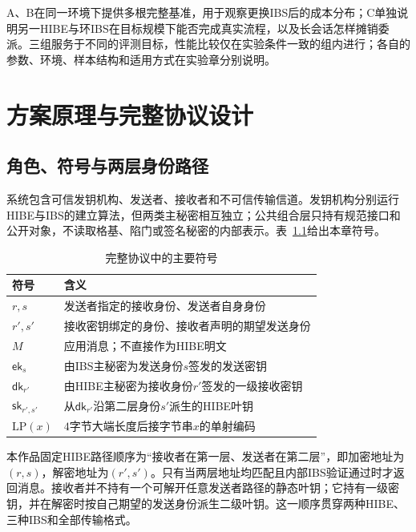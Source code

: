 \documentclass[UTF8,a4paper,12pt,oneside,openany,fontset=fandol]{ctexrep}
\begin{document}
A、B在同一环境下提供多根完整基准，用于观察更换IBS后的成本分布；C单独说明另一HIBE与环IBS在目标规模下能否完成真实流程，以及长会话怎样摊销委派。三组服务于不同的评测目标，性能比较仅在实验条件一致的组内进行；各自的参数、环境、样本结构和适用方式在实验章分别说明。

\chapter{方案原理与完整协议设计}

\section{角色、符号与两层身份路径}
系统包含可信发钥机构、发送者、接收者和不可信传输信道。发钥机构分别运行HIBE与IBS的建立算法，但两类主秘密相互独立；公共组合层只持有规范接口和公开对象，不读取格基、陷门或签名秘密的内部表示。表~\ref{tab:protocol-symbols}给出本章符号。

\begin{table}[htbp]
\centering
\small
\caption{完整协议中的主要符号}
\label{tab:protocol-symbols}
\begin{tabularx}{\textwidth}{@{}>{\centering\arraybackslash}p{}>{\raggedright\arraybackslash}X@{}}
\toprule
\rowcolor{black!8} 符号 & 含义 \\
\midrule
\(r,s\) & 发送者指定的接收身份、发送者自身身份 \\
\(r',s'\) & 接收密钥绑定的身份、接收者声明的期望发送身份 \\
\(M\) & 应用消息；不直接作为HIBE明文 \\
\(\mathsf{ek}_s\) & 由IBS主秘密为发送身份\(s\)签发的发送密钥 \\
\(\mathsf{dk}_{r'}\) & 由HIBE主秘密为接收身份\(r'\)签发的一级接收密钥 \\
\(\mathsf{sk}_{r',s'}\) & 从\(\mathsf{dk}_{r'}\)沿第二层身份\(s'\)派生的HIBE叶钥 \\
\(\mathrm{LP}(x)\) & \(4\)字节大端长度后接字节串\(x\)的单射编码 \\
\bottomrule
\end{tabularx}
\end{table}

本作品固定HIBE路径顺序为“接收者在第一层、发送者在第二层”，即加密地址为\((r,s)\)，解密地址为\((r',s')\)。只有当两层地址均匹配且内部IBS验证通过时才返回消息。接收者并不持有一个可解开任意发送者路径的静态叶钥；它持有一级密钥，并在解密时按自己期望的发送身份派生二级叶钥。这一顺序贯穿两种HIBE、三种IBS和全部传输格式。
\end{document}
